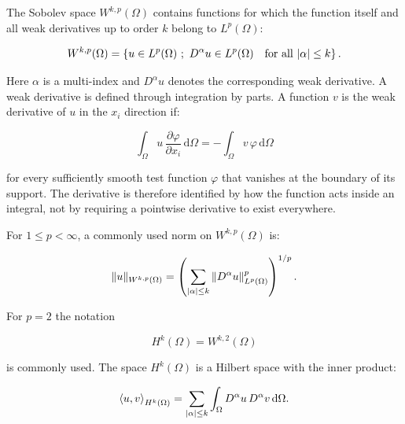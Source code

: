 The Sobolev space $ W^{k,p}(\Omega) $ contains functions for which the function
itself and all weak derivatives up to order $ k $ belong to $ L^p(\Omega) $:

\begin{bbox}
    \begin{equation}\label{sobolev-space-definition}
        W^{k,p}(\Omega) =
        \left\{
            u \in L^p(\Omega)\ ;\
            D^{\alpha}u \in L^p(\Omega)
            \quad \text{for all } | {\alpha} | \le k
        \right\}.
    \end{equation}
\end{bbox}

Here $ \alpha $ is a multi-index and $ D^{\alpha}u $ denotes the corresponding
weak derivative. A weak derivative is defined through integration by parts. A
function $ v $ is the weak derivative of $ u $ in the $ x_i $ direction if:

\begin{equation}\label{weak-derivative-definition}
    \int_{\Omega} u\,\frac{\partial \varphi}{\partial x_i}\,\mathrm{d}\Omega
    =
    -\int_{\Omega} v\,\varphi\,\mathrm{d}\Omega
\end{equation}

for every sufficiently smooth test function $ \varphi $ that vanishes at the
boundary of its support. The derivative is therefore identified by how the
function acts inside an integral, not by requiring a pointwise derivative to
exist everywhere.

For $ 1 \le p < \infty $, a commonly used norm on $ W^{k,p}(\Omega) $ is:

\begin{equation}
    \| {u} \|_{W^{k,p}(\Omega)} =
    \left(
        \sum_{| {\alpha} |\le k}
        \| {D^{\alpha}u} \|_{L^p(\Omega)}^p
    \right)^{1/p}.
\end{equation}

For $ p=2 $ the notation

\begin{equation}
    H^k(\Omega) = W^{k,2}(\Omega)
\end{equation}

is commonly used. The space $ H^k(\Omega) $ is a Hilbert space with the inner
product:

\begin{equation}
    \left< u,v \right>_{H^k(\Omega)} =
    \sum_{| {\alpha} |\le k}
    \int_{\Omega} D^{\alpha}u\,D^{\alpha}v\,\mathrm{d}\Omega.
\end{equation}

